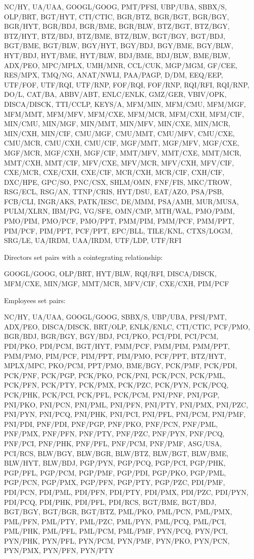 \documentclass{UoYCSproject}
\begin{document}
{NC/HY, UA/UAA, GOOGL/GOOG, PMT/PFSI, UBP/UBA, SBBX/S, OLP/BRT, BGT/HYT, CTI/CTIC, BGR/BTZ, BGR/BGT, BGR/BGY, BGR/HYT, BGR/BDJ, BGR/BME, BGR/BLW, BTZ/BGT, BTZ/BGY, BTZ/HYT, BTZ/BDJ, BTZ/BME, BTZ/BLW, BGT/BGY, BGT/BDJ, BGT/BME, BGT/BLW, BGY/HYT, BGY/BDJ, BGY/BME, BGY/BLW, HYT/BDJ, HYT/BME, HYT/BLW, BDJ/BME, BDJ/BLW, BME/BLW, ADX/PEO, MPC/MPLX, UMH/MNR, CCL/CUK, MGP/MGM, GF/CEE, RES/MPX, TMQ/NG, ANAT/NWLI, PAA/PAGP, D/DM, EEQ/EEP, UTF/FOF, UTF/RQI, UTF/RNP, FOF/RQI, FOF/RNP, RQI/RFI, RQI/RNP, DO/L, CAT/BA, ABBV/ABT, ENLC/ENLK, GMZ/GER, VBIV/OPK, DISCA/DISCK, TTI/CCLP, KEYS/A, MFM/MIN, MFM/CMU, MFM/MGF, MFM/MMT, MFM/MFV, MFM/CXE, MFM/MCR, MFM/CXH, MFM/CIF, MIN/CMU, MIN/MGF, MIN/MMT, MIN/MFV, MIN/CXE, MIN/MCR, MIN/CXH, MIN/CIF, CMU/MGF, CMU/MMT, CMU/MFV, CMU/CXE, CMU/MCR, CMU/CXH, CMU/CIF, MGF/MMT, MGF/MFV, MGF/CXE, MGF/MCR, MGF/CXH, MGF/CIF, MMT/MFV, MMT/CXE, MMT/MCR, MMT/CXH, MMT/CIF, MFV/CXE, MFV/MCR, MFV/CXH, MFV/CIF, CXE/MCR, CXE/CXH, CXE/CIF, MCR/CXH, MCR/CIF, CXH/CIF, DXC/HPE, GPC/SO, PNC/CSX, SHLM/OMN, FNF/FIS, MKC/TROW, RSG/ECL, RSG/AN, TTNP/CRIS, HYT/DSU, EAT/AZO, PSA/PSB, FCB/CLI, INGR/AKS, PATK/IESC, DE/MMM, PSA/AMH, MUR/MUSA, PULM/XLRN, IBM/PG, VG/SFE, OMN/CMP, MTH/WAL, PMO/PMM, PMO/PIM, PMO/PCF, PMO/PPT, PMM/PIM, PMM/PCF, PMM/PPT, PIM/PCF, PIM/PPT, PCF/PPT, EPC/BLL, TILE/KNL, CTXS/LOGM, SRG/LE, UA/IRDM, UAA/IRDM, UTF/LDP, UTF/RFI

Directors set pairs with a cointegrating relationship:

GOOGL/GOOG, OLP/BRT, HYT/BLW, RQI/RFI, DISCA/DISCK, MFM/CXE, MIN/MGF, MMT/MCR, MFV/CIF, CXE/CXH, PIM/PCF

Employees set pairs:

NC/HY, UA/UAA, GOOGL/GOOG, SBBX/S, UBP/UBA, PFSI/PMT, ADX/PEO, DISCA/DISCK, BRT/OLP, ENLK/ENLC, CTI/CTIC, PCF/PMO, BGR/BDJ, BGR/BGY, BGY/BDJ, PCI/PKO, PCI/PDI, PCI/PCM, PDI/PKO, PDI/PCM, BGT/HYT, PMM/PCF, PMM/PIM, PMM/PPT, PMM/PMO, PIM/PCF, PIM/PPT, PIM/PMO, PCF/PPT, BTZ/HYT, MPLX/MPC, PKO/PCM, PPT/PMO, BME/BGY, PCK/PMF, PCK/PDI, PCK/PNF, PCK/PGP, PCK/PKO, PCK/PNI, PCK/PCN, PCK/PML, PCK/PFN, PCK/PTY, PCK/PMX, PCK/PZC, PCK/PYN, PCK/PCQ, PCK/PHK, PCK/PCI, PCK/PFL, PCK/PCM, PNI/PNF, PNI/PGP, PNI/PKO, PNI/PCN, PNI/PML, PNI/PFN, PNI/PTY, PNI/PMX, PNI/PZC, PNI/PYN, PNI/PCQ, PNI/PHK, PNI/PCI, PNI/PFL, PNI/PCM, PNI/PMF, PNI/PDI, PNF/PDI, PNF/PGP, PNF/PKO, PNF/PCN, PNF/PML, PNF/PMX, PNF/PFN, PNF/PTY, PNF/PZC, PNF/PYN, PNF/PCQ, PNF/PCI, PNF/PHK, PNF/PFL, PNF/PCM, PNF/PMF, ASG/USA, PCI/RCS, BLW/BGY, BLW/BGR, BLW/BTZ, BLW/BGT, BLW/BME, BLW/HYT, BLW/BDJ, PGP/PYN, PGP/PCQ, PGP/PCI, PGP/PHK, PGP/PFL, PGP/PCM, PGP/PMF, PGP/PDI, PGP/PKO, PGP/PML, PGP/PCN, PGP/PMX, PGP/PFN, PGP/PTY, PGP/PZC, PDI/PMF, PDI/PCN, PDI/PML, PDI/PFN, PDI/PTY, PDI/PMX, PDI/PZC, PDI/PYN, PDI/PCQ, PDI/PHK, PDI/PFL, PDI/RCS, BGT/BME, BGT/BDJ, BGT/BGY, BGT/BGR, BGT/BTZ, PML/PKO, PML/PCN, PML/PMX, PML/PFN, PML/PTY, PML/PZC, PML/PYN, PML/PCQ, PML/PCI, PML/PHK, PML/PFL, PML/PCM, PML/PMF, PYN/PCQ, PYN/PCI, PYN/PHK, PYN/PFL, PYN/PCM, PYN/PMF, PYN/PKO, PYN/PCN, PYN/PMX, PYN/PFN, PYN/PTY

}
\end{document}
